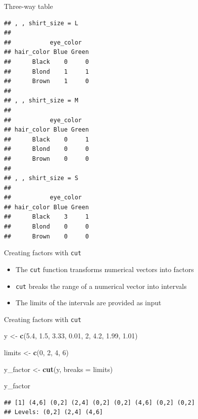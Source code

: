\documentclass[ignorenonframetext,]{beamer}
\newenvironment{Shaded}{\begin{snugshade}}{\end{snugshade}}
\newcommand{\DataTypeTok}[1]{\textcolor[rgb]{0.13,0.29,0.53}{#1}}
\newcommand{\DecValTok}[1]{\textcolor[rgb]{0.00,0.00,0.81}{#1}}
\newcommand{\FloatTok}[1]{\textcolor[rgb]{0.00,0.00,0.81}{#1}}
\newcommand{\KeywordTok}[1]{\textcolor[rgb]{0.13,0.29,0.53}{\textbf{#1}}}
\newcommand{\NormalTok}[1]{#1}
\newcommand{\StringTok}[1]{\textcolor[rgb]{0.31,0.60,0.02}{#1}}
\begin{document}
\begin{frame}[fragile]{Three-way table}
\protect\hypertarget{three-way-table-1}{}

\scriptsize

\begin{verbatim}
## , , shirt_size = L
## 
##           eye_color
## hair_color Blue Green
##      Black    0     0
##      Blond    1     1
##      Brown    1     0
## 
## , , shirt_size = M
## 
##           eye_color
## hair_color Blue Green
##      Black    0     1
##      Blond    0     0
##      Brown    0     0
## 
## , , shirt_size = S
## 
##           eye_color
## hair_color Blue Green
##      Black    3     1
##      Blond    0     0
##      Brown    0     0
\end{verbatim}

\normalsize

\end{frame}

\begin{frame}[fragile]{Creating factors with \texttt{cut}}
\protect\hypertarget{creating-factors-with-cut}{}

\begin{itemize}
\item
  The \texttt{cut} function transforms numerical vectors into factors
\item
  \texttt{cut} breaks the range of a numerical vector into intervals
\item
  The limits of the intervals are provided as input
\end{itemize}

\end{frame}

\begin{frame}[fragile]{Creating factors with \texttt{cut}}
\protect\hypertarget{creating-factors-with-cut-1}{}

\begin{Shaded}
\begin{Highlighting}[]
\NormalTok{y <-}\StringTok{ }\KeywordTok{c}\NormalTok{(}\FloatTok{5.4}\NormalTok{, }\FloatTok{1.5}\NormalTok{, }\FloatTok{3.33}\NormalTok{, }\FloatTok{0.01}\NormalTok{, }\DecValTok{2}\NormalTok{, }\FloatTok{4.2}\NormalTok{, }\FloatTok{1.99}\NormalTok{, }\FloatTok{1.01}\NormalTok{)}

\NormalTok{limits <-}\StringTok{ }\KeywordTok{c}\NormalTok{(}\DecValTok{0}\NormalTok{, }\DecValTok{2}\NormalTok{, }\DecValTok{4}\NormalTok{, }\DecValTok{6}\NormalTok{)}

\NormalTok{y_factor <-}\StringTok{ }\KeywordTok{cut}\NormalTok{(y, }\DataTypeTok{breaks =}\NormalTok{ limits)}

\NormalTok{y_factor}
\end{Highlighting}
\end{Shaded}

\begin{verbatim}
## [1] (4,6] (0,2] (2,4] (0,2] (0,2] (4,6] (0,2] (0,2]
## Levels: (0,2] (2,4] (4,6]
\end{verbatim}

\end{frame}
\end{document}
